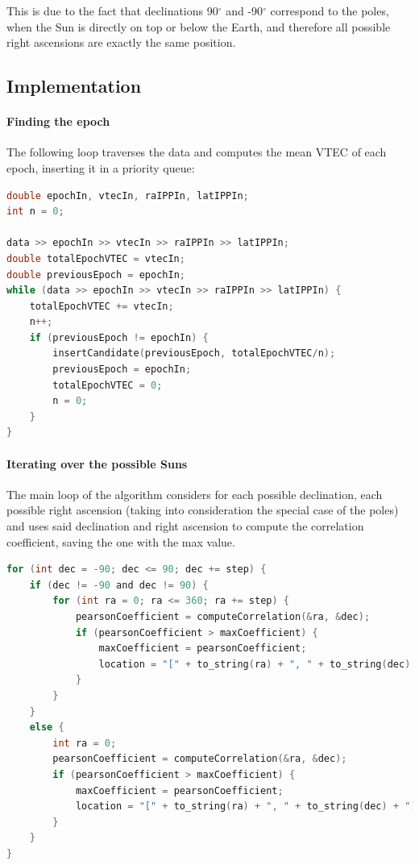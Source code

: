 This is due to the fact that declinations 90$^{\circ}$ and -90$^{\circ}$ correspond to the poles, when the Sun is directly on top or below the Earth, and therefore all possible right ascensions are exactly the same position.

\subsection{Implementation}

\paragraph{Finding the epoch}

The following loop traverses the data and computes the mean VTEC of each epoch, inserting it in a priority queue:

\begin{minipage}{\linewidth}
\begin{lstlisting}[language=c, caption=Finding a VTEC spike]
double epochIn, vtecIn, raIPPIn, latIPPIn;
int n = 0;

data >> epochIn >> vtecIn >> raIPPIn >> latIPPIn;
double totalEpochVTEC = vtecIn;
double previousEpoch = epochIn;
while (data >> epochIn >> vtecIn >> raIPPIn >> latIPPIn) {
	totalEpochVTEC += vtecIn;
	n++;
	if (previousEpoch != epochIn) {
		insertCandidate(previousEpoch, totalEpochVTEC/n);
		previousEpoch = epochIn;
		totalEpochVTEC = 0;
		n = 0;
	}
}
\end{lstlisting}
\end{minipage}


\paragraph{Iterating over the possible Suns}

The main loop of the algorithm considers for each possible declination, each possible right ascension (taking into consideration the special case of the poles) and uses said declination and right ascension to compute the correlation coefficient, saving the one with the max value.

\begin{minipage}{\linewidth}
\begin{lstlisting}[language=c, caption=Main loops]
for (int dec = -90; dec <= 90; dec += step) {
	if (dec != -90 and dec != 90) {
		for (int ra = 0; ra <= 360; ra += step) {
			pearsonCoefficient = computeCorrelation(&ra, &dec);
			if (pearsonCoefficient > maxCoefficient) {
				maxCoefficient = pearsonCoefficient;
				location = "[" + to_string(ra) + ", " + to_string(dec) + "]";
			}
		}
	}
	else {
		int ra = 0;
		pearsonCoefficient = computeCorrelation(&ra, &dec);
		if (pearsonCoefficient > maxCoefficient) {
			maxCoefficient = pearsonCoefficient;
			location = "[" + to_string(ra) + ", " + to_string(dec) + "]";
		}
	}
}
\end{lstlisting}
\end{minipage}

